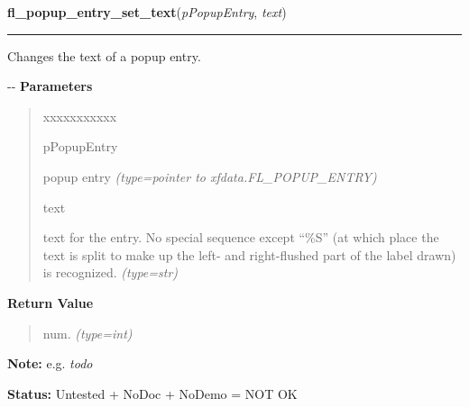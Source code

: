     \vspace{0.5ex}

\hspace{.8\funcindent}\begin{boxedminipage}{\funcwidth}

    \raggedright \textbf{fl\_popup\_entry\_set\_text}(\textit{pPopupEntry}, \textit{text})

    \vspace{-1.5ex}

    \rule{\textwidth}{0.5\fboxrule}
\setlength{\parskip}{2ex}

Changes the text of a popup entry.

-{}-
\setlength{\parskip}{1ex}
      \textbf{Parameters}
      \vspace{-1ex}

      \begin{quote}
        \begin{Ventry}{xxxxxxxxxxx}

          \item[pPopupEntry]


popup entry
            {\it (type=pointer to xfdata.FL\_POPUP\_ENTRY)}

          \item[text]


text for the entry. No special sequence except ``\%S'' (at which
place the text is split to make up the left- and right-flushed
part of the label drawn) is recognized.
            {\it (type=str)}

        \end{Ventry}

      \end{quote}

      \textbf{Return Value}
    \vspace{-1ex}

      \begin{quote}

num.
      {\it (type=int)}

      \end{quote}

\textbf{Note:} 
e.g. \emph{todo}


\textbf{Status:} 
Untested + NoDoc + NoDemo = NOT OK


    \end{boxedminipage}

    \label{xformslib:flpopup:fl_popup_entry_set_shortcut}

